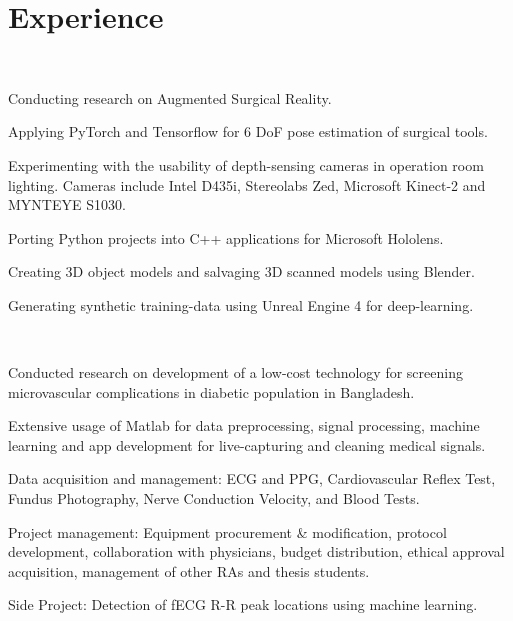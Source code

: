 \begin{minipage}[t]{0.66\textwidth} %


\section{Experience}

\\
\vspace{\topsep} %
\begin{tightitemize}
\item Conducting research on Augmented Surgical Reality.
\item Applying PyTorch and Tensorflow for 6 DoF pose estimation of surgical tools.
\item Experimenting with the usability of depth-sensing cameras in operation room lighting. Cameras include Intel D435i, Stereolabs Zed, Microsoft Kinect-2 and MYNTEYE S1030.
\item Porting Python projects into C++ applications for Microsoft Hololens.
\item Creating 3D object models and salvaging 3D scanned models using Blender. 
\item Generating synthetic training-data using Unreal Engine 4 for deep-learning.

\end{tightitemize}

\sectionspace %



\\
\begin{tightitemize}
\item Conducted research on development of a low-cost technology for screening microvascular complications in diabetic population in Bangladesh.
\item Extensive usage of Matlab for data preprocessing, signal processing, machine learning and app development for live-capturing and cleaning medical signals.
\item Data acquisition and management: ECG and PPG, Cardiovascular Reflex Test, Fundus Photography, Nerve Conduction Velocity, and Blood Tests.
\item Project management: Equipment procurement \& modification, protocol development, collaboration with physicians, budget distribution, ethical approval acquisition, management of other RAs and thesis students.
\item Side Project: Detection of fECG R-R peak locations using machine learning.
\end{tightitemize}
\sectionspace %


\end{minipage}
